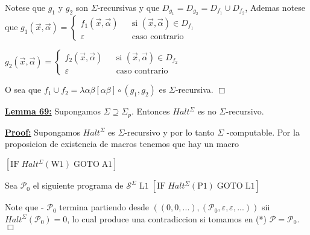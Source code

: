 Notese que \(g_{1}\) y \(g_{2}\) son \(\Sigma \)-recursivas y que \( D_{g_{1}}=D_{g_{2}}=D_{f_{1}}\cup D_{f_{2}}\), Ademas notese que
\(\displaystyle g_{1}(\vec{x},\vec{\alpha})=\left\{ \begin{array}{lll} f_{1}(\vec{x},\vec{\alpha}) & & \text{si }(\vec{x},\vec{\alpha})\in D_{f_{1}} \\ \varepsilon & & \text{caso contrario} \end{array} \right. \)

\(\displaystyle g_{2}(\vec{x},\vec{\alpha})=\left\{ \begin{array}{lll} f_{2}(\vec{x},\vec{\alpha}) & & \text{si }(\vec{x},\vec{\alpha})\in D_{f_{2}} \\ \varepsilon & & \text{caso contrario} \end{array} \right. \)

O sea que \(f_{1}\cup f_{2}=\lambda \alpha \beta \left[ \alpha \beta \right] \circ (g_{1},g_{2})\) es \(\Sigma \)-recursiva. \(\Box\)


\textbf{\underline{Lemma 69:}} Supongamos \(\Sigma \supseteq \Sigma _{p}\). Entonces \( Halt^{\Sigma }\) es no \(\Sigma \)-recursivo.

\textbf{\underline{Proof:}} Supongamos \(Halt^{\Sigma }\) es \(\Sigma \)-recursivo y por lo tanto \(\Sigma \) -computable. Por la proposicion de existencia de macros tenemos que hay un macro

\(\displaystyle \left[ \mathrm{IF}\;Halt^{\Sigma }(\mathrm{W}1)\;\mathrm{GOTO}\;\mathrm{A}1 \right] \)

Sea \(\mathcal{P}_{0}\) el siguiente programa de \(\mathcal{S}^{\Sigma }\)
\(\displaystyle \mathrm{L}1\;\left[ \mathrm{IF}\;Halt^{\Sigma }(\mathrm{P}1)\;\mathrm{GOTO}\; \mathrm{L}1\right] \)

Note que
- \(\mathcal{P}_{0}\) termina partiendo desde \(\left( (0,0,...),( \mathcal{P}_{0},\varepsilon ,\varepsilon ,...)\right) \) sii \(Halt^{\Sigma }( \mathcal{P}_{0})=0\),
lo cual produce una contradiccion si tomamos en (*) \(\mathcal{P}= \mathcal{P}_{0}\). \(\Box\)

